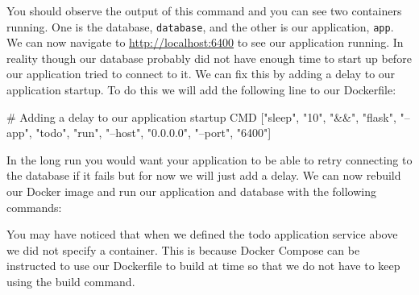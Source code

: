 \documentclass{csse4400}
\begin{document}
You should observe the output of this command and you can see two containers running.
One is the database, \texttt{database}, and the other is our application, \texttt{app}.
We can now navigate to \url{http://localhost:6400} to see our application running.
In reality though our database probably did not have enough time to start up before our application tried to connect to it.
We can fix this by adding a delay to our application startup.
To do this we will add the following line to our Dockerfile:

\begin{code}[language=docker,numbers=none]{}
# Adding a delay to our application startup
CMD ["sleep", "10", "&&", "flask", "--app", "todo", "run", "--host", "0.0.0.0", "--port", "6400"]
\end{code}

In the long run you would want your application to be able to retry connecting to the database if it fails but for now we will just add a delay.
We can now rebuild our Docker image and run our application and database with the following commands:


You may have noticed that when we defined the todo application service above we did not specify a container.
This is because Docker Compose can be instructed to use our Dockerfile to build at time so that we do not have to keep using the build command.






\end{document}

